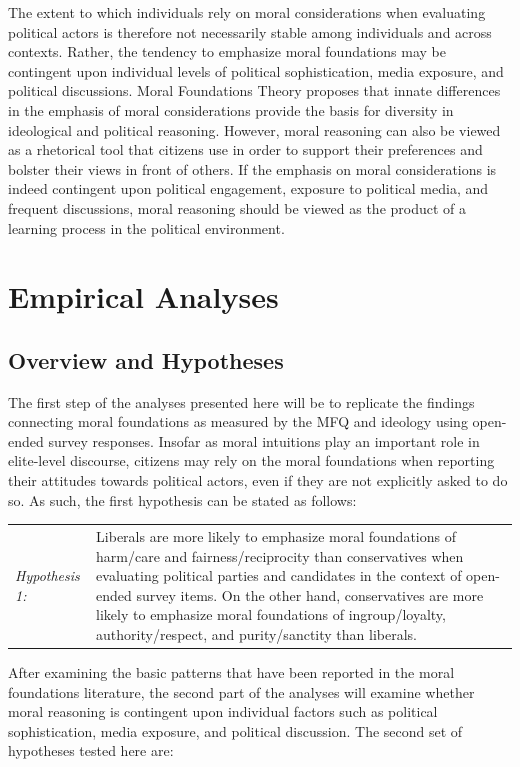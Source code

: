\documentclass[12pt]{article}
\begin{document}
The extent to which individuals rely on moral considerations when evaluating political actors is therefore not necessarily stable among individuals and across contexts. Rather, the tendency to emphasize moral foundations may be contingent upon individual levels of political sophistication, media exposure, and political discussions. Moral Foundations Theory proposes that innate differences in the emphasis of moral considerations provide the basis for diversity in ideological and political reasoning. However, moral reasoning can also be viewed as a rhetorical tool that citizens use in order to support their preferences and bolster their views in front of others. If the emphasis on moral considerations is indeed contingent upon political engagement, exposure to political media, and frequent discussions, moral reasoning should be viewed as the product of a learning process in the political environment.


\section{Empirical Analyses}

\subsection{Overview and Hypotheses}

The first step of the analyses presented here will be to replicate the findings connecting moral foundations as measured by the MFQ and ideology using open-ended survey responses. Insofar as moral intuitions play an important role in elite-level discourse, citizens may rely on the moral foundations when reporting their attitudes towards political actors, even if they are not explicitly asked to do so. As such, the first hypothesis can be stated as follows:

\vspace{0.3cm}
\begin{tabular}{lp{12cm}}
\textsl{Hypothesis 1:} & Liberals are more likely to emphasize moral foundations of harm/care and fairness/reciprocity  than conservatives when evaluating political parties and candidates in the context of open-ended survey items. On the other hand, conservatives are more likely to emphasize moral foundations of ingroup/loyalty, authority/respect, and purity/sanctity than liberals.
\end{tabular}
\vspace{0.5cm}

After examining the basic patterns that have been reported in the moral foundations literature, the second part of the analyses will examine whether moral reasoning is contingent upon individual factors such as political sophistication, media exposure, and political discussion. The second set of hypotheses tested here are:
\end{document}
